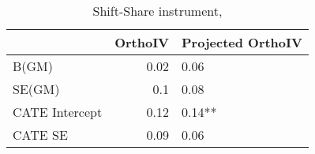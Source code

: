\begin{table}\centering\caption{Shift-Share instrument, }\begin{tabular}{lrl}
\toprule
                &   OrthoIV & Projected OrthoIV   \\
\midrule
 B(GM)          &      0.02 & 0.06                \\
 SE(GM)         &      0.1  & 0.08                \\
 CATE Intercept &      0.12 & 0.14**              \\
 CATE SE        &      0.09 & 0.06                \\
\bottomrule
\end{tabular}\end{table}